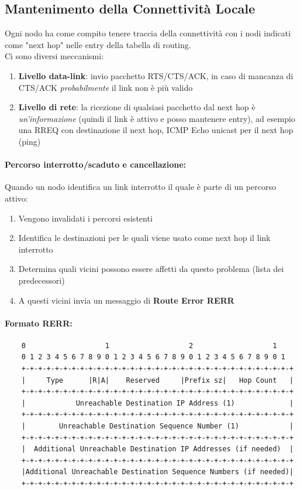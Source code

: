 \newpage

\subsection{Mantenimento della Connettività Locale}

Ogni nodo ha come compito tenere traccia della connettività con i nodi indicati come "next hop" nelle entry della tabella di routing.\\

Ci sono diversi meccanismi:
\begin{enumerate}
	\item \textbf{Livello data-link}: invio pacchetto RTS/CTS/ACK, in caso di mancanza di CTS/ACK \textit{probabilmente} il link non è più valido
	\item \textbf{Livello di rete}: la ricezione di qualsiasi pacchetto dal next hop è \textit{un'informazione} (quindi il link è attivo e posso mantenere entry), ad esempio una RREQ con destinazione il next hop, ICMP Echo unicast per il next hop (ping)
\end{enumerate}

\paragraph{Percorso interrotto/scaduto e cancellazione:} Quando un nodo identifica un link interrotto il quale è parte di un percorso attivo:
\begin{enumerate}
	\item Vengono invalidati i percorsi esistenti
	\item Identifica le destinazioni per le quali viene usato come next hop il link interrotto
	\item Determina quali vicini possono essere affetti da questo problema (lista dei predecessori)
	\item A questi vicini invia un messaggio di \textbf{Route Error RERR}
\end{enumerate} 

\paragraph{Formato RERR:}
\begin{verbatim}
	0                   1                   2                   1
	0 1 2 3 4 5 6 7 8 9 0 1 2 3 4 5 6 7 8 9 0 1 2 3 4 5 6 7 8 9 0 1
	+-+-+-+-+-+-+-+-+-+-+-+-+-+-+-+-+-+-+-+-+-+-+-+-+-+-+-+-+-+-+-+-+
	|     Type      |R|A|    Reserved     |Prefix sz|   Hop Count   |
	+-+-+-+-+-+-+-+-+-+-+-+-+-+-+-+-+-+-+-+-+-+-+-+-+-+-+-+-+-+-+-+-+
	|            Unreachable Destination IP Address (1)             |
	+-+-+-+-+-+-+-+-+-+-+-+-+-+-+-+-+-+-+-+-+-+-+-+-+-+-+-+-+-+-+-+-+
	|        Unreachable Destination Sequence Number (1)            |
	+-+-+-+-+-+-+-+-+-+-+-+-+-+-+-+-+-+-+-+-+-+-+-+-+-+-+-+-+-+-+-+-+
	|  Additional Unreachable Destination IP Addresses (if needed)  |
	+-+-+-+-+-+-+-+-+-+-+-+-+-+-+-+-+-+-+-+-+-+-+-+-+-+-+-+-+-+-+-+-+
	|Additional Unreachable Destination Sequence Numbers (if needed)|
	+-+-+-+-+-+-+-+-+-+-+-+-+-+-+-+-+-+-+-+-+-+-+-+-+-+-+-+-+-+-+-+-+
\end{verbatim}


